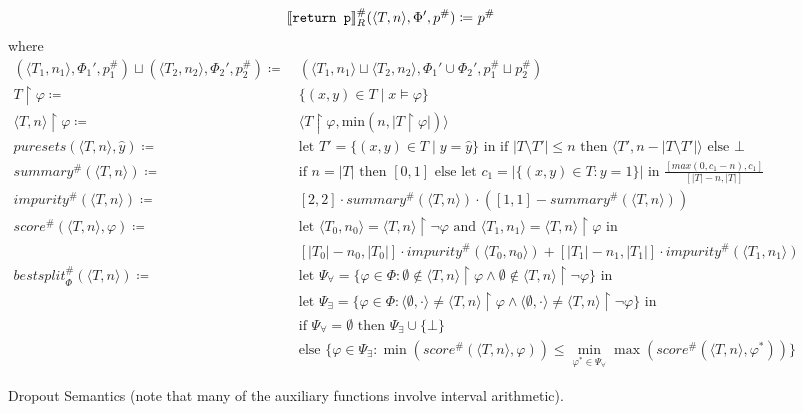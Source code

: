 \begin{figure}
\begin{align*}
%
\den[R]{\returnnode}^\#(\argtuple) \coloneqq&~ p^\#
\end{align*}
where
\begin{align*}
(\langle T_1, n_1 \rangle, \Phi_1', p_1^\#) \sqcup (\langle T_2, n_2 \rangle, \Phi_2', p_2^\#)
\coloneqq&~
(\langle T_1, n_1 \rangle \sqcup \langle T_2, n_2 \rangle,
\Phi_1' \cup \Phi_2', p_1^\# \sqcup p_2^\#) \\
%
T \upharpoonright \varphi \coloneqq&~ \{(x,y) \in T \mid x \models \varphi\} \\
%
\langle T, n \rangle \upharpoonright \varphi \coloneqq&~
\langle T \upharpoonright \varphi, \text{min}(n, |T \upharpoonright \varphi|) \rangle \\
%
\mathit{puresets}(\langle T, n\rangle, \hat{y}) \coloneqq&~
\text{let } T' = \{(x,y) \in T \mid y = \hat{y}\} \text{ in }
\text{if } |T \setminus T'| \leq n \text{ then } \langle T', n - |T \setminus T'| \rangle
\text{ else } \bot \\
%
\mathit{summary}^\#(\langle T, n \rangle) \coloneqq&~
\text{if } n = |T| \text{ then } [0, 1] \text{ else }
\text{let } c_1 = |\{(x,y) \in T : y = 1\}| \text{ in }
\frac{[max(0, c_1 - n), c_1]}{[|T| - n, |T|]}\\
%
\mathit{impurity}^\#(\langle T, n \rangle) \coloneqq&~
[2,2] \cdot \mathit{summary^\#(\langle T, n \rangle)}
\cdot ([1,1] - summary^\#(\langle T, n \rangle)) \\
%
\mathit{score}^\#(\langle T, n \rangle, \varphi) \coloneqq&~
\text{let } \langle T_0, n_0 \rangle = \langle T, n \rangle \upharpoonright \lnot \varphi
\text{ and } \langle T_1, n_1 \rangle = \langle T, n \rangle \upharpoonright \varphi \text{ in } \\
&~[|T_0| - n_0, |T_0|] \cdot \mathit{impurity}^\#(\langle T_0, n_0 \rangle) +
[|T_1| - n_1, |T_1|] \cdot \mathit{impurity}^\#(\langle T_1, n_1 \rangle)\\
%
\mathit{bestsplit}^\#_\Phi(\langle T, n \rangle) \coloneqq&~
\text{let } \Psi_\forall = \{\varphi \in \Phi : \emptyset \not \in \langle T, n \rangle \upharpoonright \varphi
\land \emptyset \not \in \langle T, n \rangle \upharpoonright \lnot\varphi\} \text{ in } \\
&~\text{let } \Psi_\exists = \{\varphi \in \Phi :
\langle \emptyset, \cdot \rangle \neq \langle T, n \rangle \upharpoonright \varphi \land
\langle \emptyset, \cdot \rangle \neq \langle T, n \rangle \upharpoonright \lnot \varphi \} \text{ in } \\
&~\text{if } \Psi_\forall = \emptyset \text{ then } \Psi_\exists \cup \{\bot\} \\
&~\text{else } \{\varphi \in \Psi_\exists : \min(\mathit{score}^\#(\langle T, n \rangle, \varphi))
\leq \min_{\varphi^* \in \Psi_\forall} \max(\mathit{score}^\#(\langle T, n \rangle, \varphi^*))\}
\end{align*}
\caption{Dropout Semantics (note that many of the auxiliary functions involve interval arithmetic).}
\label{fig:abstract}
\end{figure}

